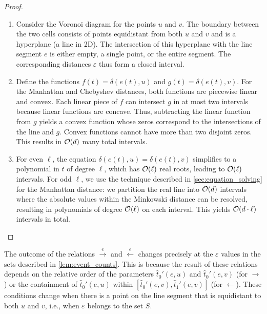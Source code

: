 \begin{proof}
  \begin{enumerate}
		\item Consider the Voronoi diagram for the points \(u\) and \(v\). The boundary between the two cells consists of points equidistant from both \(u\) and \(v\) and is a hyperplane (a line in 2D). The intersection of this hyperplane with the line segment \(e\) is either empty, a single point, or the entire segment. The corresponding distances \(\varepsilon\) thus form a closed interval.

		\item Define the functions \(f(t) = \delta(e(t), u)\) and \(g(t) = \delta(e(t), v)\). For the Manhattan and Chebyshev distances, both functions are piecewise linear and convex. Each linear piece of \(f\) can intersect \(g\) in at most two intervals because linear functions are concave. Thus, subtracting the linear function from \(g\) yields a convex function whose zeros correspond to the intersections of the line and \(g\). Convex functions cannot have more than two disjoint zeros. This results in \(\mathcal{O}(d)\) many total intervals. 

		\item For even \(\ell\), the equation \(\delta(e(t), u) = \delta(e(t),v)\) simplifies to a polynomial in \(t\) of degree \(\ell\), which has \(\mathcal{O}(\ell)\) real roots, leading to \(\mathcal{O}(\ell)\) intervals. For odd \(\ell\), we use the technique described in \cref{sec:equation_solving} for the Manhattan distance: we partition the real line into \(\mathcal{O}(d)\) intervals where the absolute values within the Minkowski distance can be resolved, resulting in polynomials of degree \(\mathcal{O}(\ell)\) on each interval. This yields \(\mathcal{O}(d \cdot \ell)\) intervals in total.
  \end{enumerate}
\end{proof}

The outcome of the relations \(\overset e\rightarrow\) and \(\overset e\leftarrow\) changes precisely at the \(\varepsilon\) values in the sets described in \cref{lem:event_counts}. This is because the result of these relations depends on the relative order of the parameters \(\hat t_0'(e, u)\) and \(\hat t_0'(e, v)\) (for \(\rightarrow\)) or the containment of \(\hat t_0'(e, u)\) within \([\hat t_0'(e, v), \hat t_1'(e, v)]\) (for \(\leftarrow\)). These conditions change when there is a point on the line segment that is equidistant to both \(u\) and \(v\), i.e., when \(\varepsilon\) belongs to the set \(S\).

